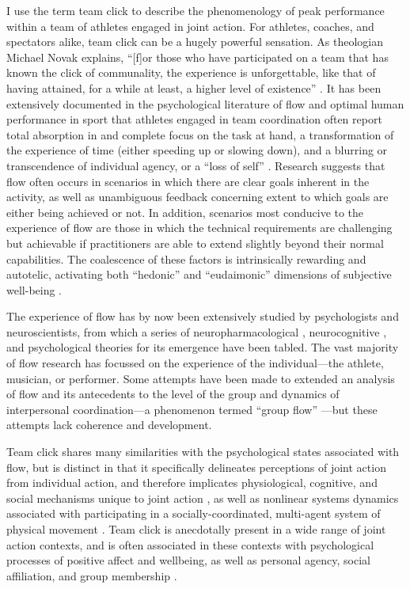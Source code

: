 \begin{CJK}{UTF8}{gbsn}
I use the term team click to describe the phenomenology of peak performance within a team of athletes engaged in joint action.  For athletes, coaches, and spectators alike, team click can be a hugely powerful sensation. As theologian Michael Novak explains, ``[f]or those who have participated on a team that has known the click of communality, the experience is unforgettable, like that of having attained, for a while at least, a higher level of existence'' \citep[11]{White2011}. It has been extensively documented in the psychological literature of flow and optimal human performance in sport that athletes engaged in team coordination often report total absorption in and complete focus on the task at hand, a transformation of the experience of time (either speeding up or slowing down), and a blurring or transcendence of individual agency, or a ``loss of self''   \citep{Csikszentmihalyi1992,Jackson1995,Jackson1999,McNeill1995}.  Research suggests that flow often occurs in scenarios in which there are clear goals inherent in the activity, as well as unambiguous feedback concerning extent to which goals are either being achieved or not.  In addition, scenarios most conducive to the experience of flow are those in which the technical requirements are challenging but achievable if practitioners are able to extend slightly beyond their normal capabilities\citep{Fong2015}.
The coalescence of these factors is intrinsically rewarding and autotelic\citep{Csikszentmihalyi1975}, activating both ``hedonic'' and ``eudaimonic'' dimensions of subjective well-being \citep{Huta2010,Fave2009}.

The experience of flow has by now been extensively studied by psychologists and neuroscientists, from which a series of neuropharmacological \citep{Boecker2008}, neurocognitive \citep{Dietrich2006,Dietrich2011,Labelle2013}, and psychological \citep{Csikszentmihalyi1992} theories for its emergence have been tabled.  The vast majority of flow research has focussed on the experience of the individual---the athlete, musician, or performer.  Some attempts have been made to extended an analysis of flow and its antecedents to the level of the group and dynamics of interpersonal coordination---a phenomenon termed ``group flow'' \citep{Sawyer2006}---but these attempts lack coherence and development.

Team click shares many similarities with the psychological states associated with flow, but is distinct in that it specifically delineates perceptions of joint action from individual action, and therefore implicates physiological, cognitive, and social mechanisms unique to joint action \citep{Vesper2010}, as well as nonlinear systems dynamics associated with participating in a socially-coordinated, multi-agent system of physical movement \citep{Kelso2009}.  Team click is anecdotally present in a wide range of joint action contexts, and is often associated in these contexts with psychological processes of positive affect and wellbeing, as well as personal agency, social affiliation, and group membership \citep{Jackson1995,Marsh2009,Wheatley2012,Slingerland2014}.


\end{CJK}
